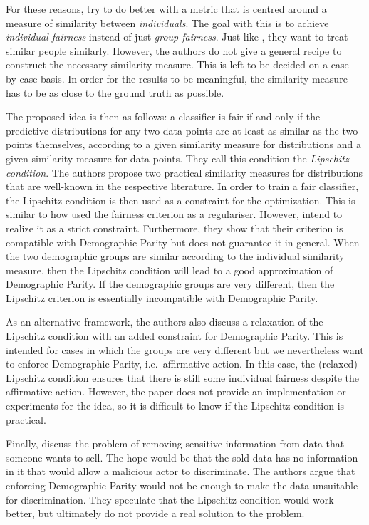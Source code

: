 For these reasons, \citet{dwork2012fairness} try to do better with a metric
that is centred around a measure of similarity between \emph{individuals}.
The goal with this is to achieve \emph{individual fairness} instead of just \emph{group fairness}.
Just like \citet{luong2011k}, they want to treat similar people similarly.
However, the authors do not give a general recipe to construct the necessary similarity measure.
This is left to be decided on a case-by-case basis.
In order for the results to be meaningful,
the similarity measure has to be as close to the ground truth as possible.

The proposed idea is then as follows: a classifier is fair
if and only if the predictive distributions for any two data points
are at least as similar as the two points themselves,
according to a given similarity measure for distributions
and a given similarity measure for data points.
They call this condition the \emph{Lipschitz condition}.
The authors propose two practical similarity measures for distributions
that are well-known in the respective literature.
In order to train a fair classifier,
the Lipschitz condition is then used as a constraint for the optimization.
This is similar to how \citet{kamishima2011fairness} used the fairness criterion as a regulariser.
However, \citet{dwork2012fairness} intend to realize it as a strict constraint.
Furthermore, they show that their criterion is compatible with Demographic Parity
but does not guarantee it in general.
When the two demographic groups are similar according to the individual similarity measure,
then the Lipschitz condition will lead to a good approximation of Demographic Parity.
If the demographic groups are very different,
then the Lipschitz criterion is essentially incompatible with Demographic Parity.

As an alternative framework,
the authors also discuss a relaxation of the Lipschitz condition with an added constraint for Demographic Parity.
This is intended for cases in which the groups are very different
but we nevertheless want to enforce Demographic Parity, i.e.~affirmative action.
In this case, the (relaxed) Lipschitz condition ensures
that there is still some individual fairness despite the affirmative action.
However, the paper does not provide an implementation or experiments for the idea,
so it is difficult to know if the Lipschitz condition is practical.

Finally, \citet{dwork2012fairness} discuss the problem of removing sensitive information
from data that someone wants to sell.
The hope would be that the sold data has no information in it
that would allow a malicious actor to discriminate.
The authors argue that enforcing Demographic Parity would not be enough
to make the data unsuitable for discrimination.
They speculate that the Lipschitz condition would work better,
but ultimately do not provide a real solution to the problem.

